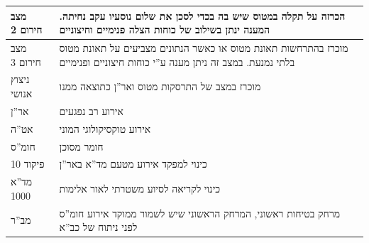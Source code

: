 \documentclass{article}
\begin{document}
\begin{center}
\begin{tabularx}{\textwidth}{XX}
        \midrule
        מצב חירום 2 & הכרזה על תקלה במטוס שיש בה בכדי לסכן את שלום נוסעיו עקב נחיתה. המענה ינתן בשילוב של כוחות הצלה פנימיים וחיצוניים \\
        \midrule
        מצב חירום 3 & מוכרז בהתרחשות תאונת מטוס או כאשר הנתונים מצביעים על תאונת מטוס בלתי נמנעת. במצב זה ניתן מענה ע''י כוחות חיצוניים ופנימיים \\
        \midrule
        ניצוץ אנושי & מוכרז במצב של התרסקות מטוס ואר''ן כתוצאה ממנו \\
        \midrule
        אר''ן & אירוע רב נפגעים \\
        \midrule
        אט''ה & אירוע טוקסיקולוגי המוני \\
        \midrule
        חומ''ס & חומר מסוכן \\
        \midrule
        פיקוד 10 & כינוי למפקד אירוע מטעם מד''א באר''ן \\
        \midrule
        מד''א 1000 & כינוי לקריאה לסיוע משטרתי לאור אלימות \\
        \midrule
        מב''ר & מרחק בטיחות ראשוני, המרחק הראשוני שיש לשמור ממוקד אירוע חומ''ס לפני ניתוח של כב''א \\
        \bottomrule
    \end{tabularx}
\end{center}
\end{document}
